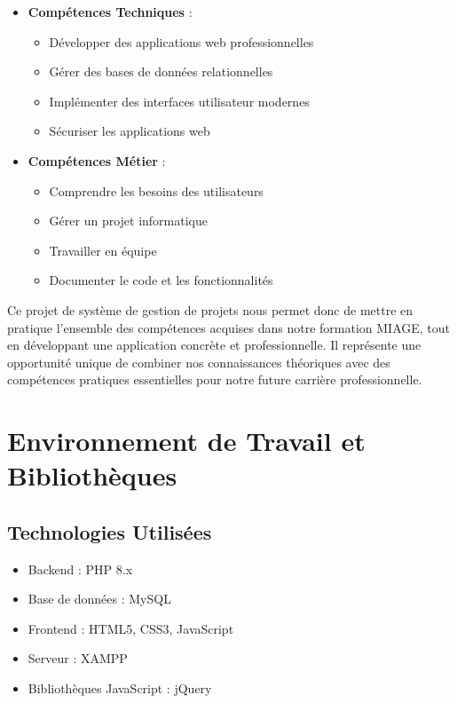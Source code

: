 \documentclass[12pt,a4paper]{article}
\begin{document}
\begin{itemize}
    \item \textbf{Compétences Techniques} :
    \begin{itemize}
        \item Développer des applications web professionnelles
        \item Gérer des bases de données relationnelles
        \item Implémenter des interfaces utilisateur modernes
        \item Sécuriser les applications web
    \end{itemize}

    \item \textbf{Compétences Métier} :
    \begin{itemize}
        \item Comprendre les besoins des utilisateurs
        \item Gérer un projet informatique
        \item Travailler en équipe
        \item Documenter le code et les fonctionnalités
    \end{itemize}
\end{itemize}

Ce projet de système de gestion de projets nous permet donc de mettre en pratique l'ensemble des compétences acquises dans notre formation MIAGE, tout en développant une application concrète et professionnelle. Il représente une opportunité unique de combiner nos connaissances théoriques avec des compétences pratiques essentielles pour notre future carrière professionnelle.

\section{Environnement de Travail et Bibliothèques}
\subsection{Technologies Utilisées}
\begin{itemize}
    \item Backend : PHP 8.x
    \item Base de données : MySQL
    \item Frontend : HTML5, CSS3, JavaScript
    \item Serveur : XAMPP
    \item Bibliothèques JavaScript : jQuery
\end{itemize}
\end{document}
